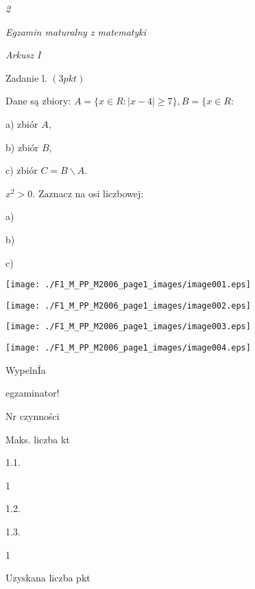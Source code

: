 \documentclass[a4paper,12pt]{article}
\begin{document}
{\it 2}

{\it Egzamin maturalny z matematyki}

{\it Arkusz I}

Zadanie l. $(3pkt)$

Dane są zbiory: $A=\{x\in R:|x-4|\geq 7\}, B=\{x\in R$:

a) zbiór $A,$

b) zbiór $B,$

c) zbiór $C=B\backslash A.$

$x^{2}>0$. Zaznacz na osi liczbowej:

a)

b)

c)
\begin{center}
\texttt{[image: ./F1\_M\_PP\_M2006\_page1\_images/image001.eps]}

\texttt{[image: ./F1\_M\_PP\_M2006\_page1\_images/image002.eps]}

\texttt{[image: ./F1\_M\_PP\_M2006\_page1\_images/image003.eps]}

\texttt{[image: ./F1\_M\_PP\_M2006\_page1\_images/image004.eps]}
\end{center}
WypelnÍa

egzaminator!

Nr czynności

Maks. liczba kt

1.1.

1

1.2.

1.3.

1

Uzyskana liczba pkt
\end{document}
